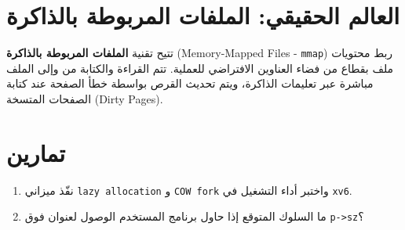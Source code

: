 \section{العالم الحقيقي: الملفات المربوطة بالذاكرة}
\label{sec:mmap_files}

تتيح تقنية \textbf{الملفات المربوطة بالذاكرة} (Memory-Mapped Files - \texttt{mmap}) ربط محتويات ملف بقطاع من فضاء العناوين الافتراضي للعملية.
تتم القراءة والكتابة من وإلى الملف مباشرة عبر تعليمات الذاكرة، ويتم تحديث القرص بواسطة خطأ الصفحة عند كتابة الصفحات المتسخة (Dirty Pages).

\section{تمارين}
\label{sec:exercises_pgfault}

\begin{enumerate}
  \item نفّذ ميزاني \texttt{lazy allocation} و \texttt{COW fork} واختبر أداء التشغيل في \texttt{xv6}.
  \item ما السلوك المتوقع إذا حاول برنامج المستخدم الوصول لعنوان فوق \texttt{p->sz}؟
\end{enumerate}

